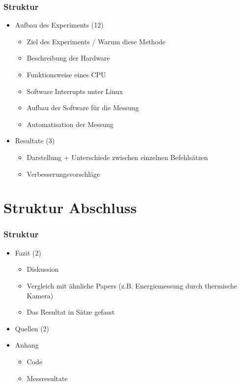 \documentclass{beamer}
\begin{document}
\begin{frame}
\frametitle{Struktur} 
\begin{itemize}
\item Aufbau des Experiments (12)
 \begin{itemize}
 \item Ziel des Experiments / Warum diese Methode
 \item Beschreibung der Hardware
 \item Funktionsweise eines CPU
 \item Software Interrupts unter Linux
 \item Aufbau der Software für die Messung
 \item Automatisation der Messung 
 \end{itemize}
 \item Resultate (3)
 \begin{itemize}
 \item Darstellung + Unterschiede zwischen einzelnen Befehlsätzen
 \item Verbesserungsvorschläge
 \end{itemize}
\end{itemize}
\end{frame}

\section{Struktur Abschluss} 
\begin{frame}
\frametitle{Struktur} 
\begin{itemize}
\item Fazit (2)
\begin{itemize}
  \item Diskussion
  \item Vergleich mit ähnliche Papers (z.B. Energiemessung durch thermische Kamera)
  \item Das Resultat in Sätze gefasst
\end{itemize}
\item Quellen (2)

\item Anhang
\begin{itemize}
\item Code
\item Messresultate 
\end{itemize}

\end{itemize}
\end{frame}
\end{document}
